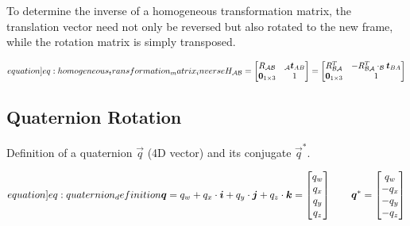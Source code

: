 
To determine the inverse of a homogeneous transformation matrix, the translation vector need not only be reversed but also rotated to the new frame, while the rotation matrix is simply transposed.

\begin{equation}
    \label[equation]{eq:homogeneous_transformation_matrix_inverse}
    H_{\mathcal A \mathcal B} = \begin{bmatrix} R_{\mathcal A \mathcal B} & _\mathcal A \vec t_{AB} \\ \vec 0_{1\times 3} & 1 \end{bmatrix}
    = \begin{bmatrix} R_{\mathcal B \mathcal A}^T & -R_{\mathcal B \mathcal A}^T \cdot _\mathcal B \vec t_{BA} \\ \vec 0_{1\times 3} & 1 \end{bmatrix} 
\end{equation}

\subsection{Quaternion Rotation}

Definition of a quaternion $\vec q$ (4D vector) and its conjugate $\vec q^*$.

\begin{equation}
    \label[equation]{eq:quaternion_definition}
    \vec q = q_w + q_x\cdot \vec i + q_y\cdot \vec j + q_z\cdot \vec k = \begin{bmatrix} q_w \\ q_x \\ q_y \\ q_z \end{bmatrix} \qquad
    \vec q^* = \begin{bmatrix} q_w \\ -q_x \\ -q_y \\ -q_z \end{bmatrix}
\end{equation}

